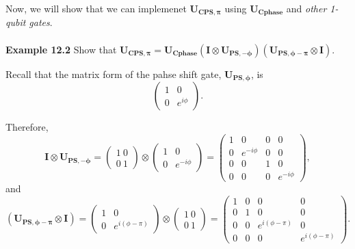 \documentclass{article}
\begin{document}
Now, we will show that we can implemenet $\boldsymbol{U_{CPS,\pi}}$ using $\boldsymbol{U_{Cphase}}$
and \textit{other 1-qubit gates}.
\\\\
\textbf{Example 12.2} Show that $\boldsymbol{U_{CPS,\pi}}=\boldsymbol{U_{Cphase}}(\boldsymbol{I}\otimes\boldsymbol{U_{PS,-\phi}})
(\boldsymbol{U_{PS,\phi-\pi}}\otimes\boldsymbol{I})$.

Recall that the matrix form of the pahse shift gate, $\boldsymbol{U_{PS,\phi}}$, is
\begin{equation}\label{eq 12.6}
  \begin{pmatrix}
    1&0\\0&e^{i\phi}
  \end{pmatrix}.\tag{12.6}
\end{equation}

Therefore,
\begin{equation}\label{eq 12.7}
  \boldsymbol{I}\otimes\boldsymbol{U_{PS,-\phi}}=\begin{pmatrix}
    1\ 0\\ 0\ 1
  \end{pmatrix}\otimes
  \begin{pmatrix}
    1&0\\0&e^{-i\phi}
  \end{pmatrix}=
  \begin{pmatrix}
    1&0&0&0\\0&e^{-i\phi}&0&0\\0&0&1&0\\0&0&0&e^{-i\phi}
  \end{pmatrix},\tag{12.7}
\end{equation}
and
\begin{equation}\label{eq 12.8}
  (\boldsymbol{U_{PS,\phi-\pi}}\otimes\boldsymbol{I})=
  \begin{pmatrix}
    1&0\\0&e^{i(\phi-\pi)}
  \end{pmatrix}\otimes
  \begin{pmatrix}
    1\ 0\\ 0\ 1
  \end{pmatrix}=
  \begin{pmatrix}
    1&0&0&0\\0&1&0&0\\0&0&e^{i(\phi-\pi)}&0\\0&0&0&e^{i(\phi-\pi)}
  \end{pmatrix}.\tag{12.8}
\end{equation}
\end{document}
